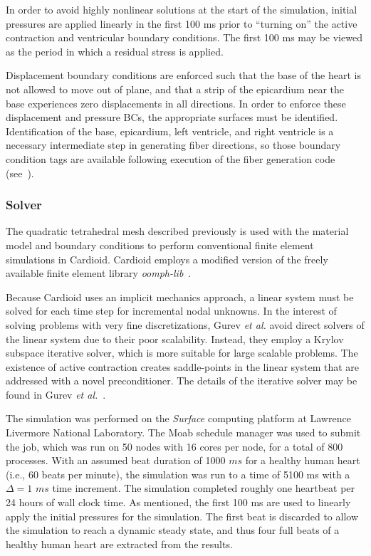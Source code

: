 In order to avoid highly nonlinear solutions at the start of the simulation, initial pressures are applied linearly in the first 100 ms prior to ``turning on'' the active contraction and ventricular boundary conditions. The first 100 ms may be viewed as the period in which a residual stress is applied.

Displacement boundary conditions are enforced such that the base of the heart is not allowed to move out of plane, and that a strip of the epicardium near the base experiences zero displacements in all directions. In order to enforce these displacement and pressure BCs, the appropriate surfaces must be identified. Identification of the base, epicardium, left ventricle, and right ventricle is a necessary intermediate step in generating fiber directions, so those boundary condition tags are available following execution of the fiber generation code (see~).

\subsubsection{Solver}
\label{Solver}

The quadratic tetrahedral mesh described previously is used with the material model and boundary conditions to perform conventional finite element simulations in Cardioid. Cardioid employs a modified version of the freely available finite element library \textit{oomph-lib}~\cite{oomph}.

Because Cardioid uses an implicit mechanics approach, a linear system must be solved for each time step for incremental nodal unknowns. In the interest of solving problems with very fine discretizations, Gurev \textit{et al.} avoid direct solvers of the linear system due to their poor scalability. Instead, they employ a Krylov subspace iterative solver, which is more suitable for large scalable problems. The existence of active contraction creates saddle-points in the linear system that are addressed with a novel preconditioner. The details of the iterative solver may be found in Gurev \textit{et al.}~\cite{gurev_2015}.

The simulation was performed on the \textit{Surface} computing platform at Lawrence Livermore National Laboratory. The Moab schedule manager was used to submit the job, which was run on 50 nodes with 16 cores per node, for a total of 800 processes. With an assumed beat duration of 1000 $ms$ for a healthy human heart (i.e., 60 beats per minute), the simulation was run to a time of 5100 ms with a $\Delta = 1$ $ms$ time increment. The simulation completed roughly one heartbeat per 24 hours of wall clock time. As mentioned, the first 100 ms are used to linearly apply the initial pressures for the simulation. The first beat is discarded to allow the simulation to reach a dynamic steady state, and thus four full beats of a healthy human heart are extracted from the results.

